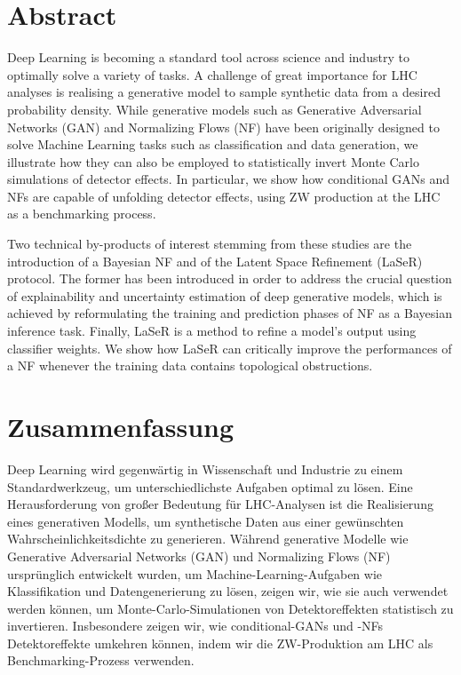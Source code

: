 %
%
\thispagestyle{empty}
%
\vspace*{1cm}
\section*{Abstract}

Deep Learning is becoming a standard tool across science and industry to optimally solve a variety of tasks.
A challenge of great importance for LHC analyses is realising a generative model to sample synthetic data from a desired probability density.
While generative models such as Generative Adversarial Networks (GAN) and Normalizing Flows (NF) have been originally designed to solve Machine Learning tasks such as classification and data generation, we illustrate how they can also be employed to statistically invert Monte Carlo simulations of detector effects. 
In particular, we show how conditional GANs and NFs are capable of unfolding detector effects, using ZW production at the LHC as a benchmarking process.

Two technical by-products of interest stemming from these studies are the introduction of a Bayesian NF and of the Latent Space Refinement (LaSeR) protocol. The former has been introduced in order to address the crucial question of explainability and uncertainty estimation of deep generative models, which is achieved by reformulating the training and prediction phases of NF as a Bayesian inference task. Finally, LaSeR is a method to refine a model's output using classifier weights. We show how LaSeR can critically improve the performances of a NF whenever the training data contains topological obstructions.

\vspace*{2.2cm}
\section*{Zusammenfassung}

Deep Learning wird gegenwärtig in Wissenschaft und Industrie zu einem Standardwerkzeug, um unterschiedlichste Aufgaben optimal zu lösen.
Eine Herausforderung von großer Bedeutung für LHC-Analysen ist die Realisierung eines generativen Modells, um synthetische Daten aus einer gewünschten Wahrscheinlichkeitsdichte zu generieren. Während generative Modelle wie Generative Adversarial Networks (GAN) und Normalizing Flows (NF) ursprünglich entwickelt wurden, um Machine-Learning-Aufgaben wie Klassifikation und Datengenerierung zu lösen, zeigen wir, wie sie auch verwendet werden können, um Monte-Carlo-Simulationen von Detektoreffekten statistisch zu invertieren.
Insbesondere zeigen wir, wie conditional-GANs und -NFs Detektoreffekte umkehren können, indem wir die ZW-Produktion am LHC als Benchmarking-Prozess verwenden.

